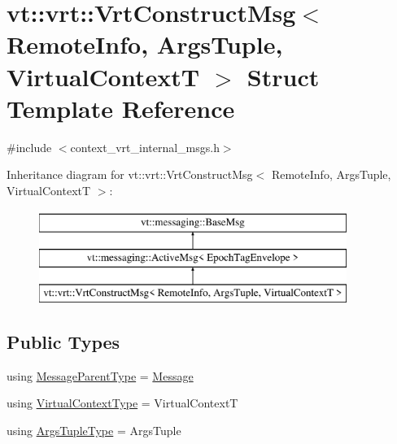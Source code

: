 \hypertarget{structvt_1_1vrt_1_1_vrt_construct_msg}{}\section{vt\+:\+:vrt\+:\+:Vrt\+Construct\+Msg$<$ Remote\+Info, Args\+Tuple, Virtual\+ContextT $>$ Struct Template Reference}
\label{structvt_1_1vrt_1_1_vrt_construct_msg}


{\ttfamily \#include $<$context\+\_\+vrt\+\_\+internal\+\_\+msgs.\+h$>$}

Inheritance diagram for vt\+:\+:vrt\+:\+:Vrt\+Construct\+Msg$<$ Remote\+Info, Args\+Tuple, Virtual\+ContextT $>$\+:\begin{figure}[H]
\begin{center}
\leavevmode
\includegraphics[height=3.000000cm]{structvt_1_1vrt_1_1_vrt_construct_msg}
\end{center}
\end{figure}
\subsection*{Public Types}
\begin{DoxyCompactItemize}
\item 
using \hyperlink{structvt_1_1vrt_1_1_vrt_construct_msg_a221d426f1d0e6b42618fb587d903ff0e}{Message\+Parent\+Type} = \hyperlink{namespacevt_a3a3ddfef40b4c90915fa43cdd5f129ea}{Message}
\item 
using \hyperlink{structvt_1_1vrt_1_1_vrt_construct_msg_aa5ff9ea61a1fcefeb0272fa0f5b6adc9}{Virtual\+Context\+Type} = Virtual\+ContextT
\item 
using \hyperlink{structvt_1_1vrt_1_1_vrt_construct_msg_a5ec9caa553a3004bce6a6ee151d15900}{Args\+Tuple\+Type} = Args\+Tuple
\end{DoxyCompactItemize}
